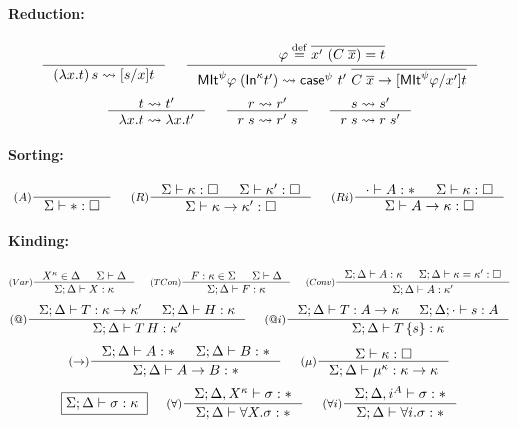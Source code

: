 \paragraph{Reduction:} 
\[ \inference{}{(\lambda x.t)\,s \rightsquigarrow [s/x]t}
 ~~~~
   \inference{ \varphi \defeq \overline{x' ~ (C\;\overline{x}) = t} }
             { \MIt^\psi \varphi\;(\In^\kappa t')
             \rightsquigarrow
               \case^\psi~t'~\overline{C\;\overline{x} -> [\MIt^\psi \varphi/x']t}
      }
\]
\[ \inference{t \rightsquigarrow t'}{\lambda x.t \rightsquigarrow \lambda x.t'}
 ~~~~
   \inference{r \rightsquigarrow r'}{r\;s \rightsquigarrow r'\;s}
 ~~~~
   \inference{s \rightsquigarrow s'}{r\;s \rightsquigarrow r\;s'}
\]

\paragraph{Sorting:}
\fbox{$\Sigma |- \kappa : \square$}
\[ \inference[($A$)]{}{\Sigma |- *:\square}
 ~~~~
   \inference[($R$)]{ \Sigma |- \kappa:\square
                    & \Sigma |- \kappa':\square }
                    { \Sigma |- \kappa -> \kappa' : \square }
 ~~~~
   \inference[($Ri$)]{\cdot |- A:* & \Sigma |- \kappa:\square}
                     {\Sigma |- A -> \kappa : \square}
\]

\paragraph{Kinding:}
\[ \inference[($Var$)]{X^\kappa\in\Delta & \Sigma |- \Delta}
                      {\Sigma;\Delta |- X : \kappa}
 ~~~~
   \inference[($TCon$)]{F:\kappa\in\Sigma & \Sigma |- \Delta}
                       {\Sigma;\Delta |- F : \kappa}
 ~~~~
   \inference[($Conv$)]{ \Sigma;\Delta |- A : \kappa
                       & \Sigma;\Delta |- \kappa = \kappa' : \square }
                       {\Sigma;\Delta |- A : \kappa'}
\]
\[
   \inference[($@$)]{ \Sigma;\Delta |- T : \kappa -> \kappa'
                    & \Sigma;\Delta |- H : \kappa }
                    {\Sigma;\Delta |- T\,H : \kappa'}
 ~~~~
   \inference[($@i$)]{ \Sigma;\Delta |- T : A -> \kappa
                     & \Sigma;\Delta;\cdot |- s : A }
                     {\Sigma;\Delta |- T\,\{s\} : \kappa}
\]
\[ \inference[($->$)]{\Sigma;\Delta |- A : * & \Sigma;\Delta |- B : *}
                     {\Sigma;\Delta |- A -> B : * }
 ~~~~
   \inference[($\mu$)]{\Sigma |- \kappa : \square}
                       {\Sigma;\Delta |- \mu^\kappa : \kappa -> \kappa}
\]
\[ \fbox{$\Sigma;\Delta |- \sigma : \kappa$ }
 ~~~~
   \inference[($\forall$)]{\Sigma;\Delta, X^\kappa |- \sigma : *}
                          {\Sigma;\Delta |- \forall X . \sigma : *}
 ~~~~
   \inference[($\forall i$)]{\Sigma;\Delta, i^A |- \sigma : *}
                            {\Sigma;\Delta |- \forall i . \sigma : *}
\]


